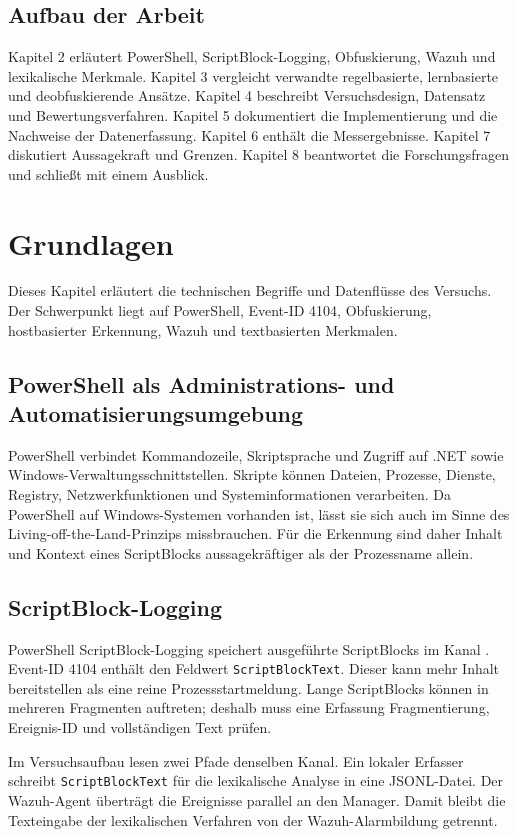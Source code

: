 \documentclass[12pt,a4paper,oneside,parskip=half]{scrreprt}
\begin{document}
\section{Aufbau der Arbeit}
Kapitel 2 erläutert PowerShell, ScriptBlock-Logging, Obfuskierung, Wazuh und lexikalische Merkmale. Kapitel 3 vergleicht verwandte regelbasierte, lernbasierte und deobfuskierende Ansätze. Kapitel 4 beschreibt Versuchsdesign, Datensatz und Bewertungsverfahren. Kapitel 5 dokumentiert die Implementierung und die Nachweise der Datenerfassung. Kapitel 6 enthält die Messergebnisse. Kapitel 7 diskutiert Aussagekraft und Grenzen. Kapitel 8 beantwortet die Forschungsfragen und schließt mit einem Ausblick.
\chapter{Grundlagen}

Dieses Kapitel erläutert die technischen Begriffe und Datenflüsse des Versuchs. Der Schwerpunkt liegt auf PowerShell, Event-ID 4104, Obfuskierung, hostbasierter Erkennung, Wazuh und textbasierten Merkmalen.

\section{PowerShell als Administrations- und Automatisierungsumgebung}
PowerShell verbindet Kommandozeile, Skriptsprache und Zugriff auf .NET sowie Windows-Verwaltungsschnittstellen. Skripte können Dateien, Prozesse, Dienste, Registry, Netzwerkfunktionen und Systeminformationen verarbeiten. Da PowerShell auf Windows-Systemen vorhanden ist, lässt sie sich auch im Sinne des Living-off-the-Land-Prinzips missbrauchen. Für die Erkennung sind daher Inhalt und Kontext eines ScriptBlocks aussagekräftiger als der Prozessname allein.

\section{ScriptBlock-Logging}
PowerShell ScriptBlock-Logging speichert ausgeführte ScriptBlocks im Kanal  \cite{microsoft-logging-windows,microsoft-logging}. Event-ID 4104 enthält den Feldwert \texttt{ScriptBlockText}. Dieser kann mehr Inhalt bereitstellen als eine reine Prozessstartmeldung. Lange ScriptBlocks können in mehreren Fragmenten auftreten; deshalb muss eine Erfassung Fragmentierung, Ereignis-ID und vollständigen Text prüfen.

Im Versuchsaufbau lesen zwei Pfade denselben Kanal. Ein lokaler Erfasser schreibt \texttt{ScriptBlockText} für die lexikalische Analyse in eine JSONL-Datei. Der Wazuh-Agent überträgt die Ereignisse parallel an den Manager. Damit bleibt die Texteingabe der lexikalischen Verfahren von der Wazuh-Alarmbildung getrennt.
\end{document}

